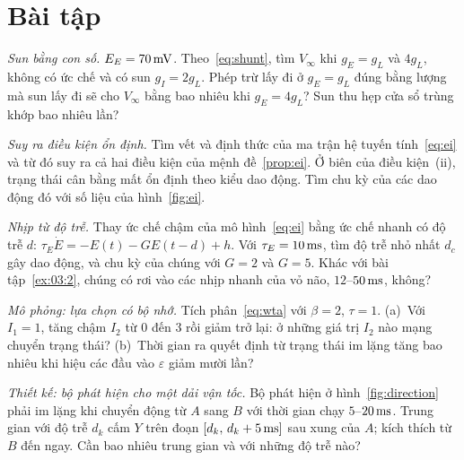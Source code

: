 \section{Bài tập}

\begin{exercise}[\lvlA]
\label{ex:03:1}
\emph{Sun bằng con số.} $E_E=70\,\text{mV}$. Theo~\eqref{eq:shunt}, tìm $V_\infty$ khi $g_E=g_L$ và $4g_L$, không có ức chế và có sun $g_I=2g_L$. Phép trừ lấy đi ở $g_E=g_L$ đúng bằng lượng mà sun lấy đi sẽ cho $V_\infty$ bằng bao nhiêu khi $g_E=4g_L$? Sun thu hẹp cửa sổ trùng khớp bao nhiêu lần?
\end{exercise}

\begin{exercise}[\lvlB]
\label{ex:03:2}
\emph{Suy ra điều kiện ổn định.} Tìm vết và định thức của ma trận hệ tuyến tính~\eqref{eq:ei} và từ đó suy ra cả hai điều kiện của mệnh đề~\ref{prop:ei}. Ở biên của điều kiện~(ii), trạng thái cân bằng mất ổn định theo kiểu dao động. Tìm chu kỳ của các dao động đó với số liệu của hình~\ref{fig:ei}.
\end{exercise}

\begin{exercise}[\lvlB]
\label{ex:03:3}
\emph{Nhịp từ độ trễ.} Thay ức chế chậm của mô hình~\eqref{eq:ei} bằng ức chế nhanh có độ trễ $d$: $\tau_E\dot E=-E(t)-GE(t-d)+h$. Với $\tau_E=10\,\text{ms}$, tìm độ trễ nhỏ nhất $d_c$ gây dao động, và chu kỳ của chúng với $G=2$ và $G=5$. Khác với bài tập~\ref{ex:03:2}, chúng có rơi vào các nhịp nhanh của vỏ não, $12$--$50\,\text{ms}$, không?
\end{exercise}

\begin{exercise}[\lvlB]
\label{ex:03:4}
\emph{Mô phỏng: lựa chọn có bộ nhớ.} Tích phân~\eqref{eq:wta} với $\beta=2$, $\tau=1$. (a)~Với $I_1=1$, tăng chậm $I_2$ từ $0$ đến $3$ rồi giảm trở lại: ở những giá trị $I_2$ nào mạng chuyển trạng thái? (b)~Thời gian ra quyết định từ trạng thái im lặng tăng bao nhiêu khi hiệu các đầu vào $\varepsilon$ giảm mười lần?
\end{exercise}

\begin{exercise}[\lvlB]
\label{ex:03:5}
\emph{Thiết kế: bộ phát hiện cho một dải vận tốc.} Bộ phát hiện ở hình~\ref{fig:direction} phải im lặng khi chuyển động từ $A$ sang $B$ với thời gian chạy $5$--$20\,\text{ms}$. Trung gian  với độ trễ $d_k$ cấm $Y$ trên đoạn $[d_k,\,d_k+5\,\text{ms}]$ sau xung của $A$; kích thích từ $B$ đến ngay. Cần bao nhiêu trung gian và với những độ trễ nào?
\end{exercise}

